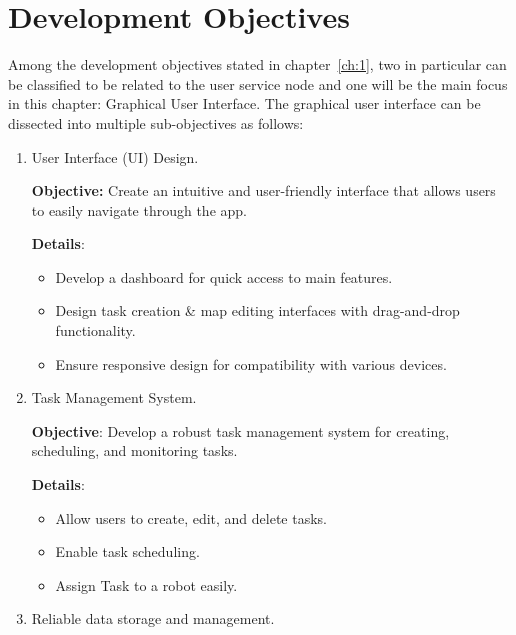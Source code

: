 \section{Development Objectives}
Among the development objectives stated in chapter~\ref{ch:1}, two in particular can be classified to be related to the user service node and one will be the main focus in this chapter: Graphical User Interface. The graphical user interface can be dissected into multiple sub-objectives as follows:
\begin{enumerate}
    \item User Interface (UI) Design.
    

            \textbf{Objective:} Create an intuitive and user-friendly interface that allows users to easily navigate through the app.
            

            \textbf{Details}:
            \begin{itemize}

                \item Develop a dashboard for quick access to main features.

                \item Design task creation \& map editing interfaces with drag-and-drop functionality.

                \item Ensure responsive design for compatibility with various devices.
            \end{itemize}

            
    \item Task Management System.


        \textbf{Objective}: Develop a robust task management system for creating, scheduling, and monitoring tasks.


        \textbf{Details}:
        \begin{itemize}

            \item Allow users to create, edit, and delete tasks.

            \item Enable task scheduling.

            \item Assign Task to a robot easily.
        \end{itemize}

\newpage
    \item Reliable data storage and management.
    

\end{enumerate}

